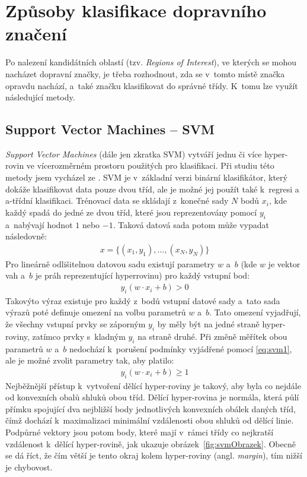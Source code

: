 \section{Způsoby klasifikace dopravního značení}
\label{zpusobyKlasifikace}
Po nalezení kandidátních oblastí (tzv. \emph{Regions of Interest}), ve kterých se mohou nacházet dopravní značky, je třeba rozhodnout, zda se v~tomto místě značka opravdu nachází, a~také značku klasifikovat do správné třídy. K~tomu lze využít následující metody.

\subsection*{Support Vector Machines -- SVM}
\label{SVM}
\emph{Support Vector Machines} (dále jen zkratka SVM) vytváří jednu či více hyper-rovin ve vícerozměrném prostoru použitých pro klasifikaci. Při studiu této metody jsem vycházel ze \cite{CVmodernApproach, classificMethodsComp3, tsDetekceSvoboda}. SVM je v~základní verzi binární klasifikátor, který dokáže klasifikovat data pouze dvou tříd, ale je možné jej použít také k~regresi a a-třídní klasifikaci. Trénovací data se skládají z~konečné sady $N$ bodů $x_i$, kde každý spadá do jedné ze dvou tříd, které jsou reprezentovány pomocí $y_i$ a~nabývají hodnot $1$ nebo $-1$. Taková datová sada potom může vypadat následovně:
\begin{align}
    \label{eq:svm0}
    x = \{(x_1,y_1),...,(x_N,y_N)\}
\end{align}
Pro lineárně odlišitelnou datovou sadu existují parametry $w$ a~$b$ (kde $w$ je vektor vah a~$b$ je práh reprezentující hyperrovinu) pro každý vstupní bod:
\begin{align}
    \label{eq:svm1}
    y_i(w \cdot x_i + b) > 0
\end{align}
Takovýto výraz existuje pro každý z~bodů vstupní datové sady a~tato sada výrazů poté definuje omezení na volbu parametrů $w$ a~$b$. Tato omezení vyjadřují, že všechny vstupní prvky se záporným $y_i$ by měly být na jedné straně hyper-roviny, zatímco prvky s~kladným $y_i$ na straně druhé. Při změně měřítek obou parametrů $w$ a~$b$ nedochází k~porušení podmínky vyjádřené pomocí \eqref{eq:svm1}, ale je možné zvolit parametry tak, aby platilo:
\begin{align}
    \label{eq:svm2}
    y_i(w \cdot x_i + b) \geq 1
\end{align}
Nejběžnější přístup k~vytvoření dělící hyper-roviny je takový, aby byla co nejdále od konvexních obalů shluků obou tříd. Dělící hyper-rovina je normála, která půlí přímku spojující dva nejbližší body jednotlivých konvexních obálek daných tříd, čímž dochází k~maximalizaci minimální vzdálenosti obou shluků od dělící linie. Podpůrné vektory jsou potom body, které mají v~rámci třídy co nejkratší vzdálenost k~dělící hyper-rovině, jak ukazuje obrázek~\ref{fig:svmObrazek}. Obecně se dá říct, že čím větší je tento okraj kolem hyper-roviny (angl. \emph{margin}), tím nižší je chybovost.


